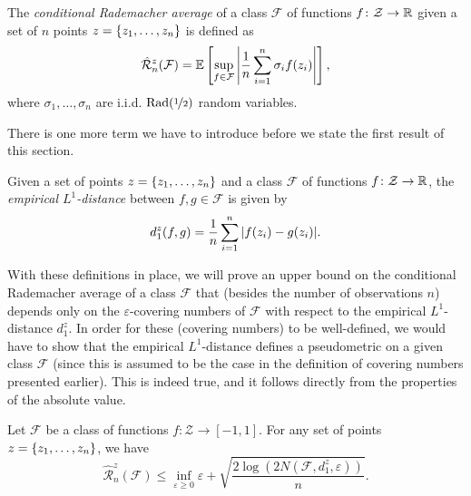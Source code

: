 \begin{definition}
The \emph{conditional Rademacher average} of a class $\mathcal{F}$ of functions $f \colon \mathcal{Z} \to \mathbb{R}$ given a set of $n$ points $z = \left\{z_1, \dots, z_n\right\}$ is defined as
\[
    \hat{\mathcal{R}}_n^z(\mathcal{F}) = \mathbb{E}\left[\sup_{f \in \mathcal{F}} \abs{\frac{1}{n} \sum_{i=1}^n \sigma_i f(z_i)}\right],
\]
where $\sigma_1, \dots, \sigma_n$ are i.i.d. $\mathrm{Rad}(\nicefrac{1}{2})$ random variables.
\end{definition}

There is one more term we have to introduce before we state the first result of this section.

\begin{definition}
Given a set of points $z = \left\{z_1, \dots, z_n\right\}$ and a class $\mathcal{F}$ of functions $f \colon \mathcal{Z} \to \mathbb{R}$, the \emph{empirical $L^1$-distance} between $f, g \in \mathcal{F}$ is given by
\[
    d_1^z(f, g) = \frac{1}{n} \sum_{i=1}^n \abs{f(z_i) - g(z_i)}.
\]
\end{definition}

With these definitions in place, we will prove an upper bound on the conditional Rademacher average of a class $\mathcal{F}$ that (besides the number of observations $n$) depends only on the $\varepsilon$-covering numbers of $\mathcal{F}$ with respect to the empirical $L^1$-distance $d_1^z$. In order for these (covering numbers) to be well-defined, we would have to show that the empirical $L^1$-distance defines a pseudometric on a given class $\mathcal{F}$ (since this is assumed to be the case in the definition of covering numbers presented earlier). This is indeed true, and it follows directly from the properties of the absolute value.

\begin{theorem}
Let $\mathcal{F}$ be a class of functions $f \colon \mathcal{Z} \to [-1, 1]$. For any set of points $z = \left\{z_1, \dots, z_n\right\}$, we have
\[
    \hat{\mathcal{R}}_n^z(\mathcal{F}) \leq \inf_{\varepsilon \geq 0} \varepsilon + \sqrt{\frac{2 \log(2 N(\mathcal{F}, d_1^z, \varepsilon))}{n}}.
\]
\end{theorem}

